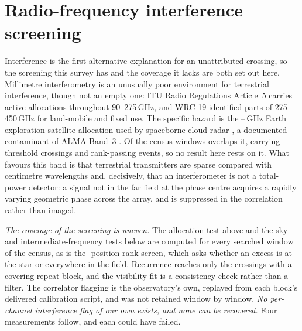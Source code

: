 \section{Radio-frequency interference screening}
\label{app:rfi}

Interference is the first alternative explanation for an unattributed
crossing, so the screening this survey has and the coverage it lacks are both
set out here. Millimetre interferometry is an unusually poor
environment for terrestrial interference, though not an empty one: ITU Radio
Regulations Article~5 \citep{ITU2024} carries active allocations throughout
90--275\,GHz, and WRC-19 identified parts of 275--450\,GHz for land-mobile and
fixed use. The specific hazard is the \RadarLo--\RadarHi\,GHz Earth
exploration-satellite allocation used by spaceborne cloud radar
\citep{CloudSat2002,EarthCARE2023}, a documented contaminant of ALMA Band~3
\citep{ALMAMemo504}. Of the \RadarNTot{} census windows \RadarNWin{} overlaps
it, carrying \RadarNCross{} threshold crossings and \RadarNStage{}
rank-passing events, so no result here rests on it. What favours this band
is that terrestrial
transmitters are sparse compared with centimetre wavelengths and, decisively,
that an interferometer is not a total-power detector: a signal not in the far
field at the phase centre acquires a rapidly varying geometric phase across
the array, and is suppressed in the correlation rather than imaged.

\emph{The coverage of the screening is uneven.} The allocation test above and
the sky- and intermediate-frequency tests below are computed for every
searched window of the census, as is the \NCtrl-position rank screen, which
asks whether an excess is at the star or everywhere in the field. Recurrence
reaches only the crossings with a covering repeat block, and the visibility
fit is a consistency check rather than a filter. The correlator flagging is
the observatory's own, replayed from each block's delivered calibration
script, and was not retained window by window. \emph{No per-channel
interference flag of our own exists, and none can be recovered.} Four
measurements follow, and each could have failed.

